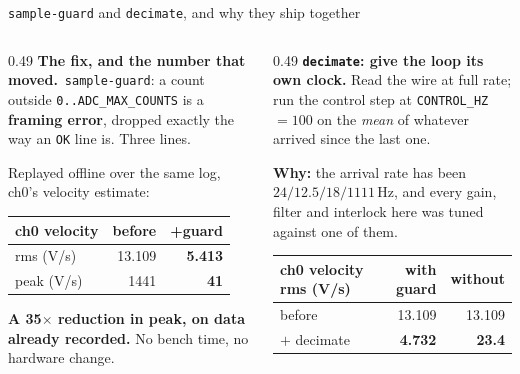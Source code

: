 \documentclass[aspectratio=169]{beamer}
\newcommand{\thefix}{\textbf{The fix, and the number that moved.}}
\begin{document}
\begin{frame}{\texttt{sample-guard} and \texttt{decimate}, and why they ship together}
  \begin{columns}[T]
    \begin{column}{0.49\textwidth}
      \footnotesize
      \thefix\ \texttt{sample-guard}: a count outside
      \texttt{0..ADC\_MAX\_COUNTS} is a \textbf{framing error}, dropped exactly
      the way an \texttt{OK} line is. Three lines.

      \vspace{1.5mm}
      Replayed offline over the same log, ch0's velocity estimate:

      \vspace{1mm}
      \centering
      {\scriptsize
      \begin{tabular}{@{}lrr@{}}
        \toprule
        ch0 velocity & before & \textbf{+guard} \\
        \midrule
        rms (V/s) & 13.109 & \textbf{5.413} \\
        peak (V/s) & 1441 & \textbf{41} \\
        \bottomrule
      \end{tabular}}

      \vspace{1.5mm}
      \raggedright
      \textbf{A 35$\times$ reduction in peak, on data already recorded.} No
      bench time, no hardware change.
    \end{column}
    \begin{column}{0.49\textwidth}
      \footnotesize
      \textbf{\texttt{decimate}: give the loop its own clock.} Read the wire at
      full rate; run the control step at \texttt{CONTROL\_HZ} $= 100$ on the
      \emph{mean} of whatever arrived since the last one.

      \vspace{1mm}
      \textbf{Why:} the arrival rate has been $24 / 12.5 / 18 / 1111$\,Hz, and
      every gain, filter and interlock here was tuned against one of them.

      \vspace{2mm}
      \centering
      {\scriptsize
      \begin{tabular}{@{}lrr@{}}
        \toprule
        ch0 velocity rms (V/s) & \textbf{with} guard & \textbf{without} \\
        \midrule
        before & 13.109 & 13.109 \\
        $+$ decimate & \textbf{4.732} & \textbf{23.4} \\
        \bottomrule
      \end{tabular}}


\end{column}
\end{columns}
\end{frame}
\end{document}
